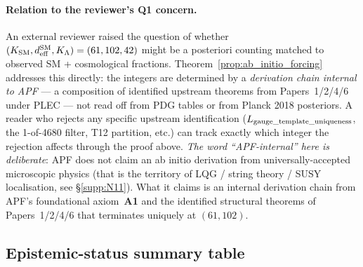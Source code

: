 \documentclass[11pt]{article}
\theoremstyle{plain}
\theoremstyle{definition}
\theoremstyle{remark}
\newcommand{\Aone}{\textbf{A1}}
\begin{document}
\paragraph{Relation to the reviewer's Q1 concern.}  An external reviewer raised the question of whether $(K_{\rm SM}, d_{\rm eff}^{\rm SM}, K_\Lambda) = (61, 102, 42)$ might be a posteriori counting matched to observed SM + cosmological fractions.  Theorem~\ref{prop:ab_initio_forcing} addresses this directly: the integers are determined by a \emph{derivation chain internal to APF} --- a composition of identified upstream theorems from Papers~1/2/4/6 under PLEC --- not read off from PDG tables or from Planck 2018 posteriors.  A reader who rejects any specific upstream identification ($L_{\rm gauge\_template\_uniqueness}$, the 1-of-4680 filter, T12 partition, etc.) can track exactly which integer the rejection affects through the proof above.  \emph{The word ``APF-internal'' here is deliberate}: APF does not claim an ab initio derivation from universally-accepted microscopic physics (that is the territory of LQG / string theory / SUSY localisation, see \S\ref{supp:N11}).  What it claims is an internal derivation chain from APF's foundational axiom~\Aone{} and the identified structural theorems of Papers~1/2/4/6 that terminates uniquely at $(61, 102)$.

\subsection{Epistemic-status summary table}\label{supp:M6}
\end{document}
